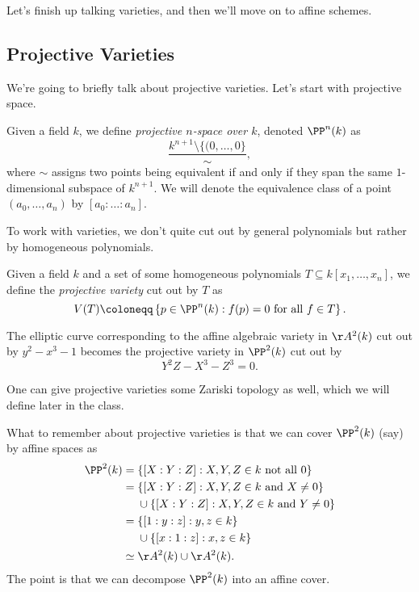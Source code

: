 \documentclass[../notes.tex]{subfiles}
\begin{document}
Let's finish up talking varieties, and then we'll move on to affine schemes.

\subsection{Projective Varieties}
We're going to briefly talk about projective varieties. Let's start with projective space.
\begin{definition}
	Given a field $k$, we define \textit{projective $n$-space over $k$}, denoted $\PP^n(k)$ as
	\[\frac{k^{n+1}\setminus\{(0,\ldots,0\}}{\sim},\]
	where $\sim$ assigns two points being equivalent if and only if they span the same $1$-dimensional subspace of $k^{n+1}$. We will denote the equivalence class of a point $(a_0,\ldots,a_n)$ by $[a_0:\ldots:a_n]$.
\end{definition}
To work with varieties, we don't quite cut out by general polynomials but rather by homogeneous polynomials.
\begin{definition}
	Given a field $k$ and a set of some homogeneous polynomials $T\subseteq k[x_1,\ldots,x_n]$, we define the \textit{projective variety} cut out by $T$ as
	\[V(T)\coloneqq\left\{p\in\PP^n(k):f(p)=0\text{ for all }f\in T\right\}.\]
\end{definition}
\begin{example} \label{ex:projec}
	The elliptic curve corresponding to the affine algebraic variety in $\AA^2(k)$ cut out by $y^2-x^3-1$ becomes the projective variety in $\PP^2(k)$ cut out by
	\[Y^2Z-X^3-Z^3=0.\]
\end{example}
\begin{remark}
	One can give projective varieties some Zariski topology as well, which we will define later in the class.
\end{remark}
What to remember about projective varieties is that we can cover $\PP^2(k)$ (say) by affine spaces as
\begin{align*}
	\PP^2(k) ={}& \{[X:Y:Z]:X,Y,Z\in k\text{ not all }0\} \\
	={}& \{[X:Y:Z]:X,Y,Z\in k\text{ and }X\ne0\} \\
	{}&\cup \{[X:Y:Z]:X,Y,Z\in k\text{ and }Y\ne0\} \\
	={}& \{[1:y:z]:y,z\in k\} \\
	{}&\cup \{[x:1:z]:x,z\in k\} \\
	\simeq{}&\AA^2(k)\cup\AA^2(k).
\end{align*}
The point is that we can decompose $\PP^2(k)$ into an affine cover.
\end{document}
